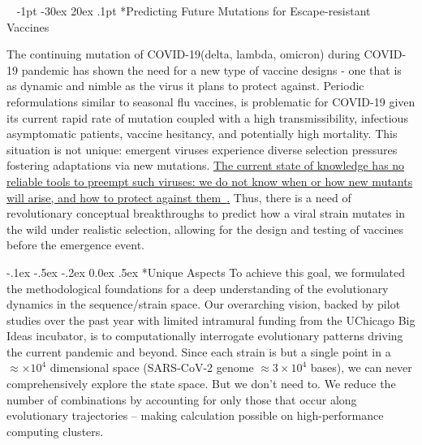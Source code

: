 \documentclass[onecolumn, compsoc,12pt]{IEEEtran}
\makeatletter
\renewcommand\section{\@startsection {section}{1}{\z@}%
                                   {-1pt \@plus -30ex \@minus 20ex}%
                                   {.1pt}%
                                   {\large\bfseries\scshape}}
\renewcommand\paragraph{\@startsection {section}{1}{\z@}%
                                   {-.1ex \@plus -.5ex \@minus -.2ex}%
                                   {0.0ex \@plus.5ex}%
                                   {\fontsize{11}{10}\selectfont\bfseries\itshape\sffamily\color{black}}}
\def\hcov{SARS-CoV-2\xspace}
\def\cov{COVID-19\xspace}
\makeatother
\begin{document}
 

\vspace{20pt}



\clearpage
\setcounter{page}{1}


$\phantom{x}$
\vspace{-35pt}  
\section*{Predicting Future Mutations for  Escape-resistant Vaccines}


The continuing mutation of \cov (delta, lambda, omicron) during \cov pandemic  has shown the need for a new type of vaccine designs - one that is as dynamic and nimble as the virus it plans to protect against. Periodic reformulations similar to  seasonal  flu vaccines,  is  problematic for \cov given its current rapid rate of mutation coupled with a high transmissibility, infectious asymptomatic patients, vaccine hesitancy, and potentially high mortality. This situation is not unique: emergent viruses experience diverse  selection pressures fostering  adaptations via new mutations. \uline{The current state of knowledge has no reliable tools to preempt such viruses: we do not know when or how new mutants will arise, and how to protect against them~\cite{gou2020systematic,fair2019viral}.} 
Thus, there is a need of revolutionary conceptual  breakthroughs to predict how a viral strain  mutates in the wild under realistic selection, allowing for the design and testing of vaccines before the emergence event.

\paragraph*{Unique Aspects} To achieve this goal, we formulated the methodological foundations for a deep understanding of the evolutionary dynamics  in  the sequence/strain space. Our overarching vision, backed by pilot studies over the past year with limited intramural  funding from the UChicago Big Ideas  incubator, is to  computationally interrogate  evolutionary patterns driving  the current  pandemic and beyond. Since each  strain is but a single point in a  $\approx  \times10^4$ dimensional space (\hcov genome  $\approx 3 \times 10^4$ bases), we can never comprehensively explore the  state space. But we don't need to. We reduce the number of combinations by accounting for only those that occur along evolutionary trajectories – making calculation possible on high-performance computing clusters.
\end{document}

